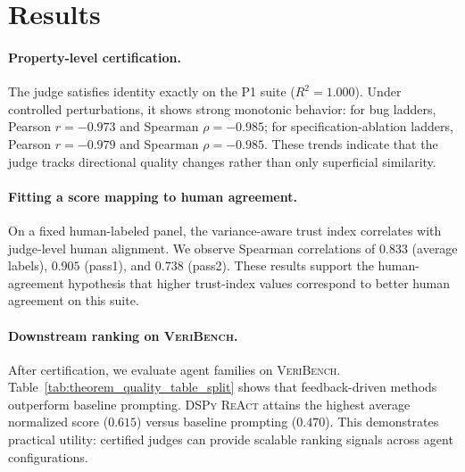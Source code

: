 \section{Results}

\paragraph{Property-level certification.}
The judge satisfies identity exactly on the P1 suite (\(R^2=1.000\)).
Under controlled perturbations, it shows strong monotonic behavior:
for bug ladders, Pearson \(r=-0.973\) and Spearman \(\rho=-0.985\);
for specification-ablation ladders, Pearson \(r=-0.979\) and Spearman \(\rho=-0.985\).
These trends indicate that the judge tracks directional quality changes rather than only superficial similarity.

\paragraph{Fitting a score mapping to human agreement.}
On a fixed human-labeled panel, the variance-aware trust index correlates with judge-level human alignment.
We observe Spearman correlations of \(0.833\) (average labels), \(0.905\) (pass1), and \(0.738\) (pass2).
These results support the human-agreement hypothesis that higher trust-index values correspond to better human agreement on this suite.

\paragraph{Downstream ranking on \textsc{VeriBench}.}
After certification, we evaluate agent families on \textsc{VeriBench}.
Table~\ref{tab:theorem_quality_table_split} shows that feedback-driven methods outperform baseline prompting.
\textsc{DSPy ReAct} attains the highest average normalized score (\(0.615\)) versus baseline prompting (\(0.470\)).
This demonstrates practical utility: certified judges can provide scalable ranking signals across agent configurations.

